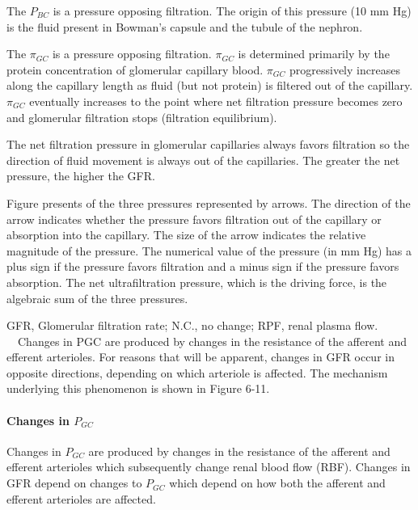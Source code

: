 The $P_{BC}$ is a pressure opposing filtration. The origin of this pressure (10 mm Hg) is the fluid present in Bowman’s capsule and the tubule of the nephron.

The $\pi_{GC}$ is a pressure opposing filtration. $\pi_{GC}$ is determined primarily by the protein concentration of glomerular capillary blood. $\pi_{GC}$ progressively increases along the capillary length as fluid (but not protein) is filtered out of the capillary. $\pi_{GC}$ eventually increases to the point where net filtration pressure becomes zero and glomerular filtration stops (filtration equilibrium). 

The net filtration pressure in glomerular capillaries always favors filtration so the direction of fluid movement is always out of the capillaries. The greater the net pressure, the higher the GFR.




Figure presents of the three pressures represented by arrows. The direction of the arrow indicates whether the pressure favors filtration out of the capillary or absorption into the capillary. The size of the arrow indicates the relative magnitude of the pressure. The numerical value of the pressure (in mm Hg) has a plus sign if the pressure favors filtration and a minus sign if the pressure favors absorption. The net ultrafiltration pressure, which is the driving force, is the algebraic sum of the three pressures.

GFR, Glomerular filtration rate; N.C., no change; RPF, renal plasma flow.   Changes in PGC are produced by changes in the resistance of the afferent and efferent arterioles. For reasons that will be apparent, changes in GFR occur in opposite directions, depending on which arteriole is affected. The mechanism underlying this phenomenon is shown in Figure 6-11.

\paragraph{Changes in $P_{GC}$}

Changes in $P_{GC}$ are produced by changes in the resistance of the afferent and efferent arterioles which subsequently change renal blood flow (RBF). Changes in GFR depend on changes to $P_{GC}$ which depend on how both the afferent and efferent arterioles are affected.

